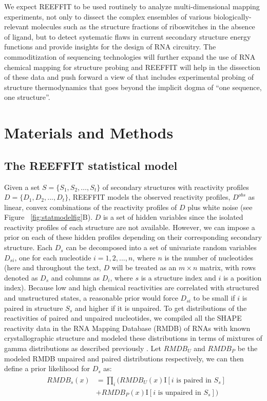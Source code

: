 \documentclass[12pt]{article}
\begin{document}
We expect REEFFIT to be used routinely to analyze multi-dimensional mapping experiments, not only to dissect the complex ensembles of various biologically-relevant molecules such as the structure fractions of riboswitches in the absence of ligand, but to detect systematic flaws in current secondary structure energy functions and provide insights for the design of RNA circuitry. 
The commoditization of sequencing technologies will further expand the use of RNA chemical mapping for structure probing and REEFFIT will help in the dissection of these data and push forward a view of that includes experimental probing of structure thermodynamics that goes beyond the implicit dogma of ``one sequence, one structure''. 



\section{Materials and Methods}

\subsection{The REEFFIT statistical model}
Given a set $S =  \{ S_1, S_2, …, S_{t} \}$ of secondary structures with reactivity profiles $D = \{ D_{1}, D_{2}, ..., D_{t} \}$, REEFFIT models the observed reactivity profiles, $D^{obs}$ as linear, convex combinations of the reactivity profiles of $D$ plus white noise (see Figure ~\ref{fig:statmodelfig}B). 
$D$ is a set of hidden variables since the isolated reactivity profiles of each structure are not available. 
However, we can impose a prior on each of these hidden profiles depending on their corresponding secondary structure. 
Each $D_{s}$ can be decomposed into a set of univariate random variables $D_{si}$, one for each nucleotide $i = 1, 2, ..., n$, where $n$ is the number of nucleotides (here and throughout the text, $D$ will be treated as an $m \times n$ matrix, with rows denoted as $D_{s}$ and columns as $D_{i}$, where $s$ is a structure index and $i$ is a position index). 
Because low and high chemical reactivities are correlated with structured and unstructured states, a reasonable prior would force $D_{si}$ to be small if $i$ is paired in structure $S_s$ and higher if it is unpaired. To get distributions of the reactivities of paired and unpaired nucleotides, we compiled all the SHAPE reactivity data in the RNA Mapping Database (RMDB) \cite{Cordero2012} of RNAs with known crystallographic structure and modeled these distributions in terms of mixtures of gamma distributions as described previously \cite{Cordero2012a}. 
Let $RMDB_U$ and $RMDB_P$ be the modeled RMDB unpaired and paired distributions respectively, we can then define a prior likelihood for $D_{s}$ as: 
\begin{align}
  &\begin{aligned}
RMDB_{s}(x) &= \prod_i (RMDB_U(x) \mbox{I}\left[i \mbox{ is paired in } S_s\right]\\ 
                &+ RMDB_P(x) \mbox{I}\left[i \mbox{ is unpaired in } S_s\right])
  \end{aligned}
\end{align}
\end{document}
